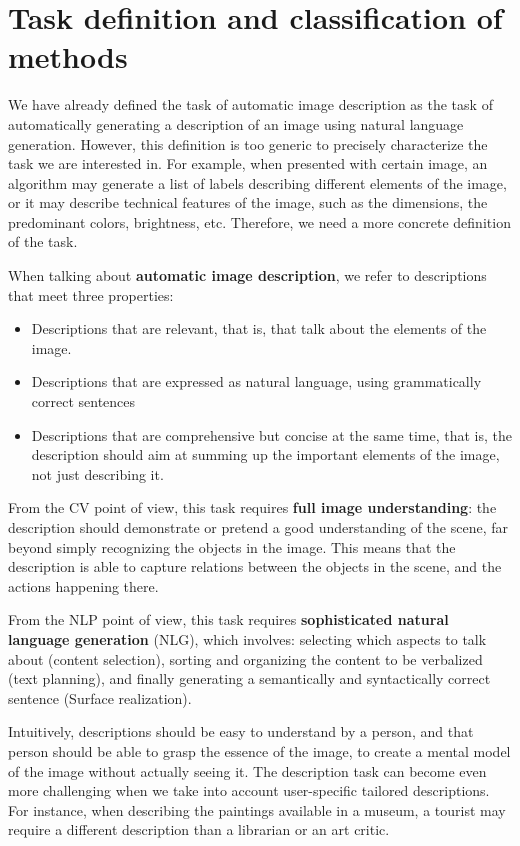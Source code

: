 \section{Task definition and classification of methods}

We have already defined the task of automatic image description as the task of automatically generating a description of an image using natural language generation. However, this definition is too generic to precisely characterize the task we are interested in. For example, when presented with certain image, an algorithm may generate a list of labels describing different elements of the image, or it may describe technical features of the image, such as the dimensions, the predominant colors, brightness, etc. Therefore, we need a more concrete definition of the task.

When talking about \textbf{automatic image description}, we refer to descriptions that meet three properties:
\begin{itemize}
\item Descriptions that are relevant, that is, that talk about the elements of the image.
\item Descriptions that are expressed as natural language, using grammatically correct sentences
\item Descriptions that are comprehensive but concise at the same time, that is, the description should aim at summing up the important elements of the image, not just describing it.
\end{itemize}

From the CV point of view, this task requires \textbf{full image understanding}: the description should demonstrate or pretend a good understanding of the scene, far beyond simply recognizing the objects in the image. This means that the description is able to capture relations between the objects in the scene, and the actions happening there.

From the NLP point of view, this task requires \textbf{sophisticated natural language generation} (NLG), which involves: selecting which aspects to talk about (content selection), sorting and organizing the content to be verbalized (text planning), and finally generating a semantically and syntactically correct sentence (Surface realization).

Intuitively, descriptions should be easy to understand by a person, and that person should be able to grasp the essence of the image, to create a mental model of the image without actually seeing it. The description task can become even more challenging when we take into account user-specific tailored descriptions. For instance, when describing the paintings available in a museum, a tourist may require a different description than a librarian or an art critic.

